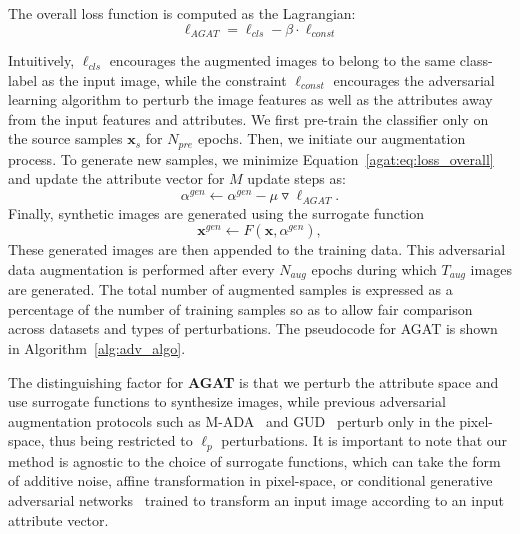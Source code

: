 \noindent The overall loss function is computed as the Lagrangian:
\begin{equation}
    \ell_{AGAT} = \ell_{cls} - \beta\cdot\ell_{const}
    \label{agat:eq:loss_overall}
\end{equation}



Intuitively, $\ell_{cls}$ encourages the augmented images to belong to the same class-label as the input image, while the constraint $\ell_{const}$ encourages the adversarial learning algorithm to perturb the image features as well as the attributes away from the input features and attributes.
We first pre-train the classifier only on the source samples $\mathbf{x}_s$ for $N_{pre}$ epochs.
Then, we initiate our augmentation process.
To generate new samples, we minimize Equation~\ref{agat:eq:loss_overall} and update the attribute vector for $M$ update steps as:
\begin{equation}
    \alpha^{gen} \gets \alpha^{gen} - \mu\triangledown \ell_{AGAT}.
\end{equation}
Finally, synthetic images are generated using the surrogate function 
\begin{equation}
    \mathbf{x}^{gen} \gets F(\mathbf{x}, \alpha^{gen}), 
\end{equation}
These generated images are then appended to the training data.
This adversarial data augmentation is performed after every $N_{aug}$ epochs during which $T_{aug}$ images are generated.
The total number of augmented samples is expressed as a percentage of the number of training samples so as to allow fair comparison across datasets and types of perturbations.
The pseudocode for AGAT is shown in Algorithm~\ref{alg:adv_algo}.


The distinguishing factor for \textbf{AGAT} is that we perturb the attribute space and use surrogate functions to synthesize images, while previous adversarial augmentation protocols such as M-ADA~\citep{qiao2020learning} and GUD~\citep{volpi2018generalizing} perturb only in the pixel-space, thus being restricted to $\ell_p$ perturbations.
It is important to note that our method is agnostic to the choice of surrogate functions, which can take the form of additive noise, affine transformation in pixel-space, or conditional generative adversarial networks~\citep{mirza2014conditional} trained to transform an input image according to an input attribute vector.


